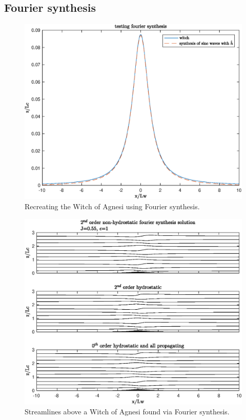 \documentclass[12pt]{article}
\begin{document}
\subsection{Fourier synthesis}


\begin{figure}
	\centering
	\includegraphics[width=1\textwidth]{witch_bathymetry.eps}
	\caption{Recreating the Witch of Agnesi using Fourier synthesis.}
\end{figure}

\begin{figure}
	\centering
	\includegraphics[width=1\textwidth]{witch_eta.eps}
	\caption{Streamlines above a Witch of Agnesi found via Fourier synthesis.}
\end{figure}
\end{document}
